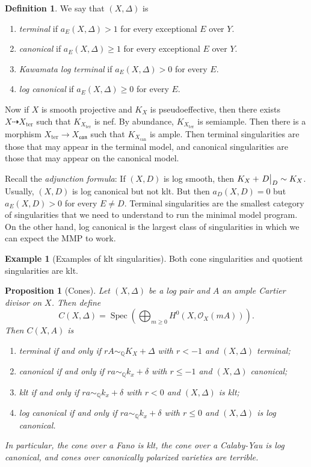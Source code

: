 \documentclass[leqno, openany]{memoir}
\newtheorem{prop}[thm]{Proposition}
\theoremstyle{definition}
\newtheorem{defn}[thm]{Definition}
\newtheorem{exm}[thm]{Example}
\theoremstyle{remark}
\theoremstyle{plain}
\theoremstyle{definition}
\theoremstyle{remark}
\newcommand{\Q}{\mathbb{Q}}
\newcommand{\msc}[1]{\mathscr{#1}}
\newcommand{\mf}[1]{\mathfrak{#1}}
\newcommand{\mr}[1]{\mathrm{#1}}
\DeclareMathOperator{\Spec}{Spec}
\begin{document}
\begin{defn}
    We say that $(X, \Delta)$ is 
    \begin{enumerate}
        \item \textit{terminal} if $a_E(X, \Delta) > 1$ for every exceptional $E$ over $Y$.
        \item \textit{canonical} if $a_E(X, \Delta) \geq 1$ for every exceptional $E$ over $Y$.
        \item \textit{Kawamata log terminal} if $a_E(X, \Delta) > 0$ for every $E$.
        \item \textit{log canonical} if $a_E(X, \Delta) \geq 0$ for every $E$.
    \end{enumerate}
\end{defn}

Now if $X$ is smooth projective and $K_X$ is pseudoeffective, then there exists $X \dashrightarrow X_{\mr{ter}}$ such that $K_{X_{\mr{ter}}}$ is nef. By abundance, $K_{X_{\mr{ter}}}$ is semiample. Then there is a morphism $X_{\mr{ter}} \to X_{\mf{can}}$ such that $K_{X_{\mr{can}}}$ is ample. Then terminal singularities are those that may appear in the terminal model, and canonical singularities are those that may appear on the canonical model.

Recall the \textit{adjunction formula}: If $(X, D)$ is log smooth, then $K_X + \eval{D}_D \sim K_X$. Usually, $(X,D)$ is log canonical but not klt. But then $a_D(X,D) = 0$ but $a_E(X, D) > 0$ for every $E \neq D$. Terminal singularities are the smallest category of singularities that we need to understand to run the minimal model program. On the other hand, log canonical is the largest class of singularities in which we can expect the MMP to work.

\begin{exm}[Examples of klt singularities]
    Both cone singularities and quotient singularities are klt. 
\end{exm}

\begin{prop}[Cones]
    Let $(X, \Delta)$ be a log pair and $A$ an ample Cartier divisor on $X$. Then define
    \[ C(X, \Delta) = \Spec (\bigoplus_{m \geq 0} H^0(X, \msc{O}_X(mA))). \]
    Then $C(X, A)$ is 
    \begin{enumerate}
        \item terminal if and only if $rA \sim_{\Q} K_X + \Delta$ with $r < -1$ and $(X, \Delta)$ terminal;
        \item canonical if and only if $ra \sim_{\Q} k_x + \delta$ with $r \leq -1$ and $(X, \Delta)$ canonical;
        \item klt if and only if $ra \sim_{\Q} k_x + \delta$ with $r < 0$ and $(X, \Delta)$ is klt;
        \item log canonical if and only if $ra \sim_{\Q} k_x + \delta$ with $r \leq 0$ and $(X, \Delta)$ is log canonical.
    \end{enumerate}
    In particular, the cone over a Fano is klt, the cone over a Calaby-Yau is log canonical, and cones over canonically polarized varieties are terrible.
\end{prop}
\end{document}
